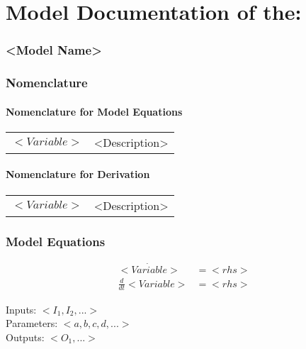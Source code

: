 \documentclass[10pt,a4paper]{article}
\begin{document}
	\part*{Model Documentation of the:}
	\section*{<Model Name>} %
	
	
	\section{Nomenclature} %
	\subsection{Nomenclature for Model Equations} %
	
	\begin{tabular}{ll}
		$<Variable>$ & <Description>		
	\end{tabular}
	
	\subsection{Nomenclature for Derivation} %
	
	\begin{tabular}{ll}
		$<Variable>$ & <Description>
	\end{tabular}
	
	
	\section{Model Equations} %
	
	\begin{subequations}
	\begin{align}
		\dot{<Variable>} &= <rhs> 	\\      %
		\frac{d}{dt} <Variable> &= <rhs> 
	\end{align}
	\end{subequations}

	\noindent
	Inputs: $<I_1,I_2,...>$ 
	\\
	Parameters: $<a,b,c,d, ...>$ %
	\\
	Outputs: $<O_1,...>$ %
	
\end{document}
